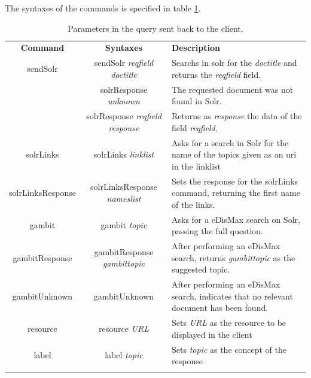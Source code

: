 The syntaxes of the commands is specified in table \ref{tab:oob-commands}.
\begin{center}
  \centering
  \begin{table}
    \begin{tabular*}{0.7\textwidth}{@{\extracolsep{\fill}} | c | c | p{} |}
      \hhline{|-|-|-|}
      \textbf{Command} & \textbf{Syntaxes} & \textbf{Description} \\ \hhline{|=|=|=|}
      sendSolr & sendSolr \textit{reqfield} \textit{doctitle} & Searchs in solr for the \textit{doctitle} and returns the \textit{reqfield} field.  \\ \hhline{|-|-|-|}
      \multirow{2}{*}{solrResponse} & solrResponse \textit{unknown} & The requested document was not found in Solr. \\ \cline{2-3}
				     & solrResponse \textit{reqfield} \textit{response} & Returns as \textit{response} the data of the field \textit{reqfield}. \\ \hhline{|-|-|-|}
      solrLinks & solrLinks \textit{linklist} & Asks for a search in Solr for the name of the topics given as an uri in the linklist \\ \hhline{|-|-|-|}
      solrLinksResponse & solrLinksResponse \textit{nameslist} & Sets the response for the solrLinks command, returning the first name of the links. \\ \hhline{|-|-|-|}
      gambit & gambit \textit{topic}& Asks for a \ac{eDisMax} search on Solr, passing the full question. \\ \hhline{|-|-|-|}
      gambitResponse & gambitResponse \textit{gambittopic} & After performing an \ac{eDisMax} search, returns \textit{gambittopic} as the suggested topic. \\ \hhline{|-|-|-|}
      gambitUnknown & gambitUnknown & After performing an \ac{eDisMax} search, indicates that no relevant document has been found. \\ \hhline{|-|-|-|}
      resource & resource \textit{URL} & Sets \textit{URL} as the resource to be displayed in the client \\ \hhline{|-|-|-|}
      label & label \textit{topic} & Sets \textit{topic} as the concept of the response \\ \hhline{|-|-|-|}
      \end{tabular*}
    \caption{Parameters in the query sent back to the client.}
    \label{tab:oob-commands}
  \end{table}
\end{center}

